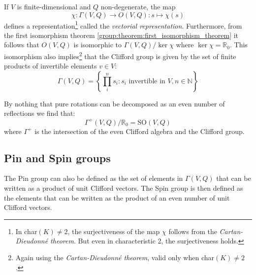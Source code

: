	\begin{property}
		If $V$ is finite-dimensional and $Q$ non-degenerate, the map
		\begin{equation}
			\chi:\Gamma(V, Q)\rightarrow O(V, Q): s\mapsto\chi(s)
		\end{equation}
		defines a representation\footnote{In char$(K)\neq2$, the surjectiveness of the map $\chi$ follows from the \textit{Cartan-Dieudonn\'e theorem}. But even in characteristic 2, the surjectiveness holds.} called the \textit{vectorial representation}. Furthermore, from the first isomorphism theorem \ref{group:theorem:first_isomorphism_theorem} it follows that $O(V, Q)$ is isomorphic to $\Gamma(V, Q)/\ker\chi$ where $\ker\chi = \mathbb{R}_0$. This isomorphism also implies\footnote{Again using the \textit{Cartan-Dieudonn\'e theorem}, valid only when char$(K)\neq2$.} that the Clifford group is given by the set of finite products of invertible elements $v\in V$:
		\begin{equation}
			\Gamma(V, Q) = \left\{\prod_i^n s_i : s_i\text{ invertible in }V, n\in\mathbb{N}\right\}
		\end{equation}
	\end{property}
	\begin{result}
		By nothing that pure rotations can be decomposed as an even number of reflections we find that:
		\begin{equation}
			\Gamma^+(V, Q)/\mathbb{R}_0 = \text{SO}(V, Q)
		\end{equation}
		where $\Gamma^+$ is the intersection of the even Clifford algebra and the Clifford group.
	\end{result}

\subsection{Pin and Spin groups}

	\begin{remark}
		The Pin group can also be defined as the set of elements in $\Gamma(V, Q)$ that can be written as a product of unit Clifford vectors. The Spin group is then defined as the elements that can be written as the product of an even number of unit Clifford vectors.
	\end{remark}
	
